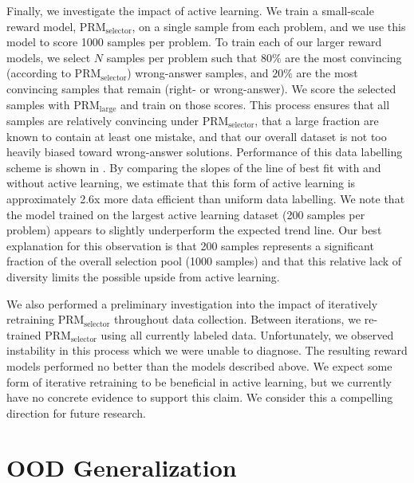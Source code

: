 \documentclass{article}
\begin{document}
Finally, we investigate the impact of active learning. We train a small-scale reward model, $\text{PRM}_{\text{selector}}$, on a single sample from each problem, and we use this model to score 1000 samples per problem. To train each of our larger reward models, we select $N$ samples per problem such that $80\%$ are the most convincing (according to $\text{PRM}_{\text{selector}}$) wrong-answer samples, and $20\%$ are the most convincing samples that remain (right- or wrong-answer). We score the selected samples with $\text{PRM}_{\text{large}}$ and train on those scores. This process ensures that all samples are relatively convincing under $\text{PRM}_{\text{selector}}$, that a large fraction are known to contain at least one mistake, and that our overall dataset is not too heavily biased toward wrong-answer solutions. Performance of this data labelling scheme is shown in . By comparing the slopes of the line of best fit with and without active learning, we estimate that this form of active learning is approximately 2.6x more data efficient than uniform data labelling. We note that the model trained on the largest active learning dataset (200 samples per problem) appears to slightly underperform the expected trend line. Our best explanation for this observation is that 200 samples represents a significant fraction of the overall selection pool (1000 samples) and that this relative lack of diversity limits the possible upside from active learning.

We also performed a preliminary investigation into the impact of iteratively retraining $\text{PRM}_{\text{selector}}$ throughout data collection. Between iterations, we re-trained $\text{PRM}_{\text{selector}}$ using all currently labeled data. Unfortunately, we observed instability in this process which we were unable to diagnose. The resulting reward models performed no better than the models described above. We expect some form of iterative retraining to be beneficial in active learning, but we currently have no concrete evidence to support this claim. We consider this a compelling direction for future research.

\section{OOD Generalization} \label{section:generalization}
\end{document}
